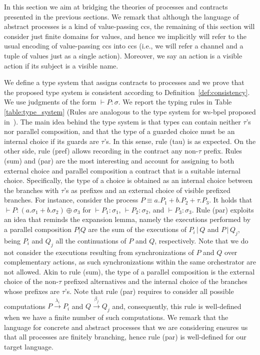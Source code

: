 \documentclass[submission,copyright,creativecommons]{eptcs}
\newcommand{\act}{\lambda}
\newcommand{\ltr}[1]{\stackrel{#1}{\longrightarrow}}
\begin{document}
In this section we aim at bridging the theories of processes and contracts presented in the previous sections. 
 We remark that although the language of abstract processes is a kind of value-passing {\sc  ccs},  the remaining of this section will consider just finite domains for values, and hence we implicitly will refer to  the usual encoding of value-passing {\sc  ccs} into {\sc  ccs} (i.e., we will refer a  channel and a tuple of values  just as a single action).  Moreover, we say an action is a visible action if its subject is a visible name.

We define a type system that assigns contracts to processes and we prove that the proposed type system is consistent according to Definition~\ref{def:consistency}.
We use judgments of the form $\vdash P: \sigma$. We report the typing rules in Table \ref{table:type_system} (Rules are analogous to the type system for {\sc ws-bpel} proposed in~\cite{CGP09:TCWS}).   
The main idea behind the type system is that types can contain neither $\tau$'s nor parallel composition, and that the type of a guarded choice must be an internal choice if its guards are $\tau$'s. In this 
sense, rule ({\sc tau}) is as expected. On the other side, rule ({\sc pref}) allows recording in the contract any non-$\tau$ prefix. Rules ({\sc sum}) and ({\sc par}) are the most interesting and account for assigning to both external choice and parallel composition a contract that is a suitable internal choice. Specifically, the type of a choice is 
obtained as an internal choice between the branches with $\tau$'s as prefixes and an external choice of visible prefixed branches. 
For instance, consider the process $P \equiv a.P_1 + b.P_2 + \tau.P_3$. It holds that $\vdash P: (a.\sigma_1 + b.\sigma_2) \oplus \sigma_3$ for $ \vdash P_1:\sigma_1$, $\vdash P_2:\sigma_2$, and $\vdash P_3:\sigma_3$.
Rule ({\sc par}) exploits an idea that reminds the expansion lemma, namely the executions performed by a parallel composition $P|Q$ are the sum of the executions of $P_i \,|\,Q$ and $P \,|\,Q_j$, being $P_i$ and $Q_j$ all the continuations of $P$ and $Q$, respectively. Note that we do not consider the executions resulting from synchronizations of $P$ and $Q$ over complementary actions, as such synchronizations within the same orchestrator are not allowed. Akin to rule ({\sc sum}), the type of a parallel composition is the external choice of the non-$\tau$ prefixed alternatives and the internal choice of the branches whose prefixes are $\tau$'s. Note that rule ({\sc par}) requires to consider all possible computations 
$P \ltr{\act_i} P_i$ and $Q \ltr{\beta_j} Q_j$ and, consequently, this rule is well-defined when we have a finite number of such computations. We remark that the language for concrete and abstract processes that we are considering ensures
us that all processes are finitely branching, hence rule ({\sc par}) is well-defined for our target language. 
\end{document}
